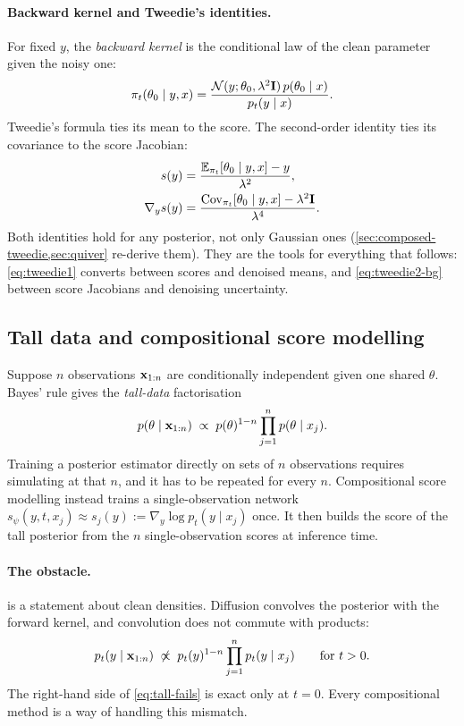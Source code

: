 \paragraph{Backward kernel and Tweedie's identities.}
For fixed $y$, the \emph{backward kernel} is the conditional law of the clean parameter given the noisy one:
\begin{equation}\label{eq:backward-kernel}
  \pi_t(\theta_0\mid y,x)=\frac{\mathcal{N}(y;\theta_0,\lambda^2\mathbf{I})\,p(\theta_0\mid x)}{p_t(y\mid x)} .
\end{equation}
Tweedie's formula ties its mean to the score.
The second-order identity ties its covariance to the score Jacobian:
\begin{align}
  s(y)&=\frac{\mathbb{E}_{\pi_t}[\theta_0\mid y,x]-y}{\lambda^2},\label{eq:tweedie1}\\
  \nabla_ys(y)&=\frac{\operatorname{Cov}_{\pi_t}[\theta_0\mid y,x]-\lambda^2\mathbf{I}}{\lambda^4}.\label{eq:tweedie2-bg}
\end{align}
Both identities hold for any posterior, not only Gaussian ones (\cref{sec:composed-tweedie,sec:quiver} re-derive them).
They are the tools for everything that follows: \cref{eq:tweedie1} converts between scores and denoised means, and \cref{eq:tweedie2-bg} between score Jacobians and denoising uncertainty.

\subsection{Tall data and compositional score modelling}\label{sec:bg-tall}

Suppose $n$ observations $\mathbf{x}_{1:n}$ are conditionally independent given one shared $\theta$.
Bayes' rule gives the \emph{tall-data} factorisation
\begin{equation}\label{eq:tall}
  p(\theta\mid\mathbf{x}_{1:n})\;\propto\;p(\theta)^{1-n}\prod_{j=1}^{n}p(\theta\mid x_j).
\end{equation}
Training a posterior estimator directly on sets of $n$ observations requires simulating at that $n$, and it has to be repeated for every $n$.
Compositional score modelling instead trains a single-observation network $s_\psi(y,t,x_j)\approx s_j(y):=\nabla_y\log p_t(y\mid x_j)$ once.
It then builds the score of the tall posterior from the $n$ single-observation scores at inference time.

\paragraph{The obstacle.}
 is a statement about clean densities.
Diffusion convolves the posterior with the forward kernel, and convolution does not commute with products:
\begin{equation}\label{eq:tall-fails}
  p_t(y\mid\mathbf{x}_{1:n})\;\not\propto\;p_t(y)^{1-n}\prod_{j=1}^np_t(y\mid x_j)\qquad\text{for }t>0 .
\end{equation}
The right-hand side of \cref{eq:tall-fails} is exact only at $t=0$.
Every compositional method is a way of handling this mismatch.

